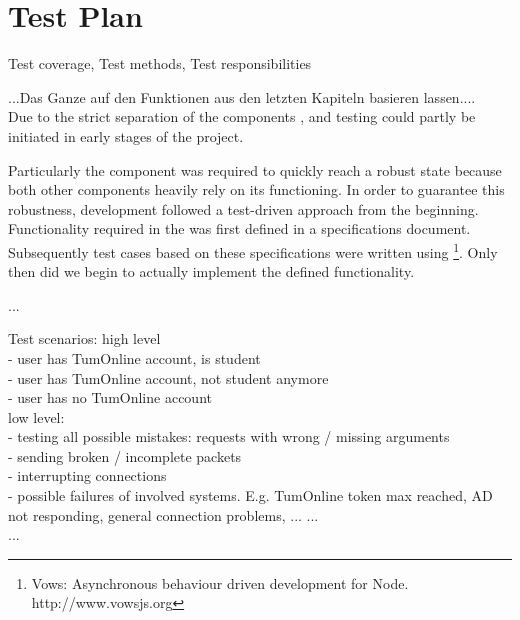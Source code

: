 \section{Test Plan}\label{sec:test_plan}

Test coverage, Test methods, Test responsibilities

...Das Ganze auf den Funktionen aus den letzten Kapiteln basieren lassen....\\


Due to the strict separation of the components \be, \ph and \ter testing could partly be initiated in early stages of the project.

Particularly the \be component was required to quickly reach a robust state because both other components heavily rely on its functioning.
In order to guarantee this robustness, development followed a test-driven approach from the beginning.
Functionality required in the \be was first defined in a specifications document.
Subsequently test cases based on these specifications were written using \vows\footnote{Vows: Asynchronous behaviour driven development for Node. http://www.vowsjs.org}.
Only then did we begin to actually implement the defined functionality.

...


Test scenarios: high level\\
- user has TumOnline account, is student\\
- user has TumOnline account, not student anymore\\
- user has no TumOnline account\\

low level:\\
- testing all possible mistakes: requests with wrong / missing arguments\\
- sending broken / incomplete packets\\
- interrupting connections\\
- possible failures of involved systems. E.g. TumOnline token max reached, AD not responding, general connection problems, ...
...\\


...

\iffalse
IEEE 829-2008, also known as the 829 Standard for Software Test Documentation, is an IEEE standard that specifies the form of a set of documents for use in defined stages of software testing, each stage potentially producing its own separate type of document.[1] These stages are:

Test plan identifier
Introduction
Test items
Features to be tested
Features not to be tested
Approach
Item pass/fail criteria
Suspension criteria and resumption requirements
Test deliverables
Testing tasks
Environmental needs
Responsibilities
Staffing and training needs
Schedule
Risks and contingencies
Approvals
\fi
